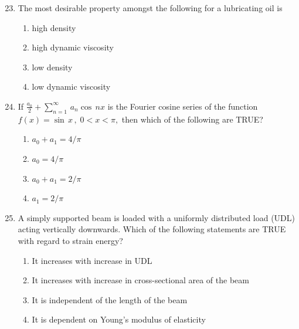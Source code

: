 \documentclass[journal]{IEEEtran}
\theoremstyle{remark}
\begin{document}
\begin{enumerate}[itemsep=1em]
\setcounter{enumi}{22}
\item The most desirable property amongst the following for a lubricating oil is
\begin{enumerate}[leftmargin=2.5em, labelsep=0.5em, itemsep=0.5em]
    \item high density 
    \item high dynamic viscosity 
    \item low density
    \item low dynamic viscosity 
\end{enumerate}
\end{enumerate}

\begin{enumerate}[itemsep=1em]
\setcounter{enumi}{23}
\item If $\frac{a_0}{2}+\sum_{n=1}^{\infty}\,a_n\cos\,nx$  is the Fourier cosine series of the function $f(x)=\sin\,x\,,\;0<x<\pi,$ then which of the following are TRUE?  
\begin{multicols}{4}
\begin{enumerate}
    \item $a_0+a_1=4/\pi$
    \item $a_0=4/\pi$
    \item $a_0+a_1=2/\pi$
    \item $a_1=2/\pi$
\end{enumerate}    
\end{multicols}
\end{enumerate}

\begin{enumerate}[itemsep=1em]
\setcounter{enumi}{24}
\item A simply supported beam is loaded with a uniformly distributed load (UDL) acting 
vertically downwards. Which of the following statements are TRUE with regard to 
strain energy?  
\begin{enumerate}[leftmargin=2.5em, labelsep=0.5em, itemsep=0.5em]
    \item It increases with increase in UDL
    \item It increases with increase in cross-sectional area of the beam 
    \item It is independent of the length of the beam 
    \item It is dependent on Young's modulus of elasticity 
\end{enumerate}
\end{enumerate}
\end{document}
